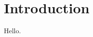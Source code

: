 \documentclass[../main.tex]{subfiles}
\begin{document}
\chapter{Introduction}

Hello.
\end{document}
